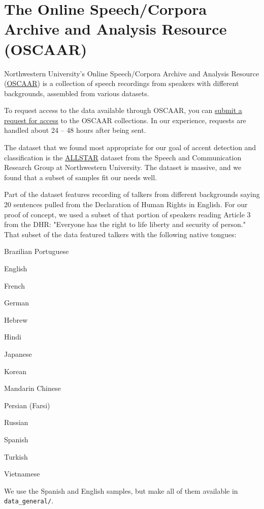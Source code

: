 \documentclass{wileySev}
\newenvironment{myitemize}{%
\begin{itemize}
\begin{multicols}{2}
}{%
\end{multicols}
\end{itemize}
}
\begin{document}
\section{The Online Speech/Corpora Archive and Analysis Resource (OSCAAR)}
Northwestern University's Online Speech/Corpora Archive and Analysis Resource (\href{https://oscaar.ci.northwestern.edu/}{OSCAAR}) is a collection of speech recordings from speakers with different backgrounds, assembled from various datasets.

To request access to the data available through OSCAAR, you can \href{https://oscaar.ci.northwestern.edu/requests.php}{submit a request for access} to the OSCAAR collections. In our experience, requests are handled about 24 -- 48 hours after being sent.

The dataset that we found most appropriate for our goal of accent detection and classification is the \href{http://groups.linguistics.northwestern.edu/speech_comm_group/allsstar/}{ALLSTAR} dataset from the Speech and Communication Research Group at Northwestern University. The dataset is massive, and we found that a subset of samples fit our needs well.

Part of the dataset features recording of talkers from different backgrounds saying 20 sentences pulled from the Declaration of Human Rights in English. For our proof of concept, we used a subset of that portion of speakers reading Article 3 from the DHR: "Everyone has the right to life liberty and security of person." That subset of the data featured 
talkers with the following native tongues:
\begin{myitemize}
\item Brazilian Portuguese
\item English
\item French
\item German
\item Hebrew
\item Hindi
\item Japanese
\item Korean
\item Mandarin Chinese
\item Persian (Farsi)
\item Russian
\item Spanish
\item Turkish
\item Vietnamese
\end{myitemize}

We use the Spanish and English samples, but make all of them available in \texttt{data\_general/}.
\end{document}
